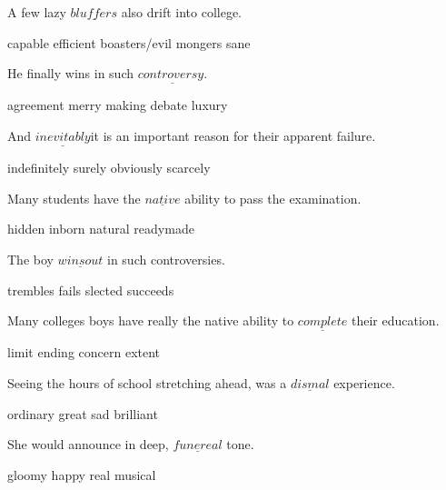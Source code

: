 \documentclass{exam}
\begin{document}
\begin{questions}
A few lazy \(\underline{bluffers}\) also drift into college.\\
\begin{oneparchoices}
\choice capable
\choice efficient
\choice boasters/evil mongers
\choice sane
\end{oneparchoices}
\question 

He finally wins in such \(\underline{controversy.}\)\\
\begin{oneparchoices}
\choice agreement
\choice merry making
\choice debate
\choice luxury
\end{oneparchoices}
\question 

And \(\underline{inevitably}\)it is an important reason for their apparent failure.\\
\begin{oneparchoices}
\choice indefinitely
\choice surely
\choice obviously
\choice scarcely
\end{oneparchoices}
\question 

Many students have the \(\underline{native}\) ability to pass the examination.\\
\begin{oneparchoices}
\choice hidden
\choice inborn
\choice natural
\choice readymade
\end{oneparchoices}
\question 

The boy \(\underline{wins out}\) in such controversies.\\
\begin{oneparchoices}
\choice trembles
\choice fails
\choice slected
\choice succeeds
\end{oneparchoices}
\question 

Many colleges boys have really the native ability to \(\underline{complete}\) their education.\\
\begin{oneparchoices}
\choice limit
\choice ending
\choice concern
\choice extent
\end{oneparchoices}
\question 

Seeing the hours of school stretching ahead, was a \(\underline{dismal}\) experience.\\
\begin{oneparchoices}
\choice ordinary
\choice great
\choice sad
\choice brilliant
\end{oneparchoices}
\question 

She would announce in deep, \(\underline{funereal}\) tone.\\
\begin{oneparchoices}
\choice gloomy
\choice happy
\choice real
\choice musical
\end{oneparchoices}
\question 


\end{questions}
\end{document}
